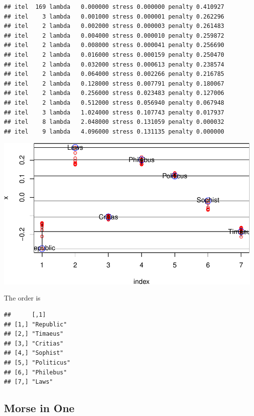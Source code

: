\documentclass[
  12pt,
]{article}
\begin{document}
\begin{verbatim}
## itel  169 lambda   0.000000 stress 0.000000 penalty 0.410927 
## itel    3 lambda   0.001000 stress 0.000001 penalty 0.262296 
## itel    2 lambda   0.002000 stress 0.000003 penalty 0.261483 
## itel    2 lambda   0.004000 stress 0.000010 penalty 0.259872 
## itel    2 lambda   0.008000 stress 0.000041 penalty 0.256690 
## itel    2 lambda   0.016000 stress 0.000159 penalty 0.250470 
## itel    2 lambda   0.032000 stress 0.000613 penalty 0.238574 
## itel    2 lambda   0.064000 stress 0.002266 penalty 0.216785 
## itel    2 lambda   0.128000 stress 0.007791 penalty 0.180067 
## itel    2 lambda   0.256000 stress 0.023483 penalty 0.127006 
## itel    2 lambda   0.512000 stress 0.056940 penalty 0.067948 
## itel    3 lambda   1.024000 stress 0.107743 penalty 0.017937 
## itel    8 lambda   2.048000 stress 0.131059 penalty 0.000032 
## itel    9 lambda   4.096000 stress 0.131135 penalty 0.000000
\end{verbatim}

\begin{center}\includegraphics{penalty_files/figure-latex/plato3-1} \end{center}

The order is

\begin{verbatim}
##      [,1]       
## [1,] "Republic" 
## [2,] "Timaeus"  
## [3,] "Critias"  
## [4,] "Sophist"  
## [5,] "Politicus"
## [6,] "Philebus" 
## [7,] "Laws"
\end{verbatim}

\subsection{Morse in One}\label{morse-in-one}
\end{document}
